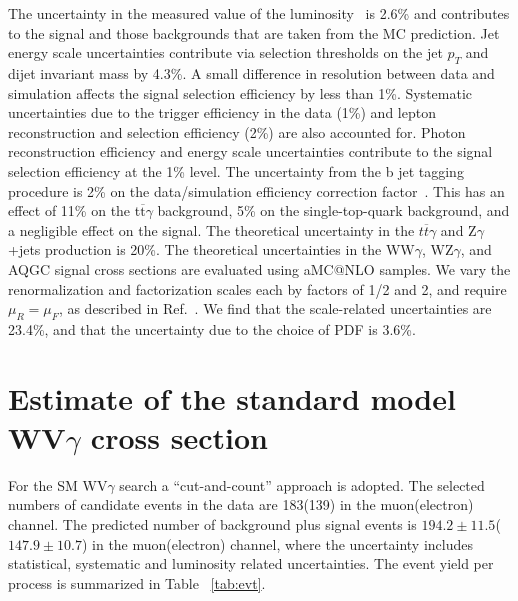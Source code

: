 The uncertainty in the measured value of the 
luminosity~\cite{lumiPAS} is 2.6\% and contributes to the signal and
those backgrounds that are taken from the MC prediction. Jet energy
scale uncertainties contribute via selection thresholds on the
jet $p_{T}$ and dijet invariant mass by 4.3\%. A small difference in \MET
resolution \cite{Chatrchyan:2011tn} between data and simulation
affects the signal selection efficiency by less than 1\%. Systematic
uncertainties due to the trigger efficiency in the data (1\%) and
lepton reconstruction and selection efficiency (2\%) are also accounted
for. Photon reconstruction efficiency and energy scale uncertainties contribute to the signal selection efficiency at the 1\% level. The uncertainty
from the b jet tagging procedure is 2\% on the data/simulation
efficiency correction factor~\cite{Chatrchyan:2012jua}. This
has an effect of 11\% on the t$\overline{\mathrm t}\gamma$ background, 5\% on the single-top-quark
background, and a negligible effect on the signal. The theoretical
uncertainty in the $t\overline{t}\gamma$ and
Z$\gamma$+jets production is 20\%. The theoretical uncertainties in the
WW$\gamma$, WZ$\gamma$, and AQGC signal cross sections are evaluated
using {\sc aMC@NLO} samples. We vary the renormalization and factorization
scales each by factors of 1/2 and 2, and require $\mu_R=\mu_F$, as described in
Ref.~\cite{Frederix:2011ss}. We find that the scale-related uncertainties are
23.4\%, and that the uncertainty due to the choice of PDF is 3.6\%.
  
\section{Estimate of the standard model WV$\gamma$ cross section}
\label{sec:xsec}

For the SM WV$\gamma$ search a ``cut-and-count'' approach is adopted. The selected numbers of candidate events 
in the data are 183(139) in the muon(electron) channel. The predicted
number of background plus signal events is $194.2 \pm 11.5$($147.9 \pm 10.7$) in the muon(electron) channel, where the 
uncertainty includes statistical, systematic and luminosity related uncertainties. 
The event yield per process is summarized in Table ~\ref{tab:evt}.

